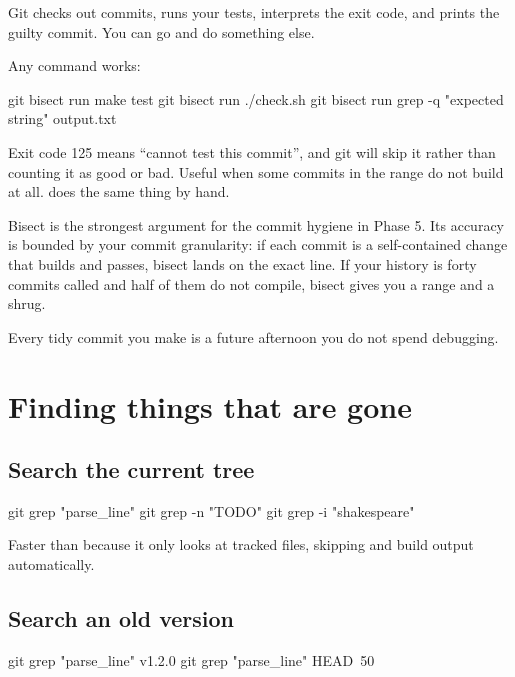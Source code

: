 \documentclass[11pt]{article}
\begin{document}
Git checks out commits, runs your tests, interprets the exit code, and prints the
guilty commit. You can go and do something else.

Any command works:

\begin{shell}
git bisect run make test
git bisect run ./check.sh
git bisect run grep -q "expected string" output.txt
\end{shell}

\begin{note}
Exit code 125 means ``cannot test this commit'', and git will skip it rather than
counting it as good or bad. Useful when some commits in the range do not build at
all.  does the same thing by hand.
\end{note}

\begin{deeper}
Bisect is the strongest argument for the commit hygiene in Phase 5. Its accuracy is
bounded by your commit granularity: if each commit is a self-contained change that
builds and passes, bisect lands on the exact line. If your history is forty commits
called  and half of them do not compile, bisect gives you a range and a
shrug.

Every tidy commit you make is a future afternoon you do not spend debugging.
\end{deeper}

\section{Finding things that are gone}

\subsection{Search the current tree}

\begin{shell}
git grep "parse_line"
git grep -n "TODO"
git grep -i "shakespeare"
\end{shell}

Faster than  because it only looks at tracked files, skipping
 and build output automatically.

\subsection{Search an old version}

\begin{shell}
git grep "parse_line" v1.2.0
git grep "parse_line" HEAD~50
\end{shell}
\end{document}
